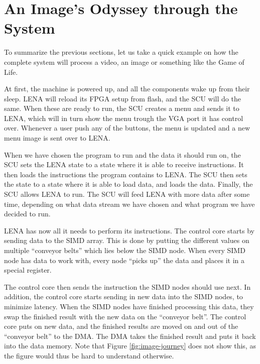 \section{An Image's Odyssey through the System}

To summarize the previous sections, let us take a quick example on how the
complete system will process a video, an image or something like the Game of
Life.

At first, the machine is powered up, and all the components wake up from their
sleep. \ac{LENA} will reload its \ac{FPGA} setup from flash, and the \ac{SCU}
will do the same. When these are ready to run, the \ac{SCU} creates a menu and
sends it to \ac{LENA}, which will in turn show the menu trough the \ac{VGA} port
it has control over. Whenever a user push any of the buttons, the menu is
updated and a new menu image is sent over to \ac{LENA}.

When we have chosen the program to run and the data it should run on, the
\ac{SCU} sets the \ac{LENA} state to a state where it is able to receive
instructions. It then loads the instructions the program contains to
\ac{LENA}. The \ac{SCU} then sets the state to a state where it is able to load
data, and loads the data. Finally, the \ac{SCU} allows \ac{LENA} to run. The
  \ac{SCU} will feed \ac{LENA} with more data after some time, depending on what
  data stream we have chosen and what program we have decided to run.

\ac{LENA} has now all it needs to perform its instructions. The control core
starts by sending data to the \ac{SIMD} array. This is done by putting the
different values on multiple ``conveyor belts'' which lies below the \ac{SIMD}
node.  When every \ac{SIMD} node has data to work with, every node ``picks
up'' the data and places it in a special register.



The control core then sends the instruction the \ac{SIMD} nodes should use
next. In addition, the control core starts sending in new data into the
\ac{SIMD} nodes, to minimize latency. When the \ac{SIMD} nodes have finished
processing this data, they swap the finished result with the new data on the
``conveyor belt''. The control core puts on new data, and the finished results
are moved on and out of the ``conveyor belt'' to the \ac{DMA}. The \ac{DMA}
takes the finished result and puts it back into the data memory.  Note that Figure
\ref{fig:image-journey} does not show this, as the figure would thus be hard to
understand otherwise.

